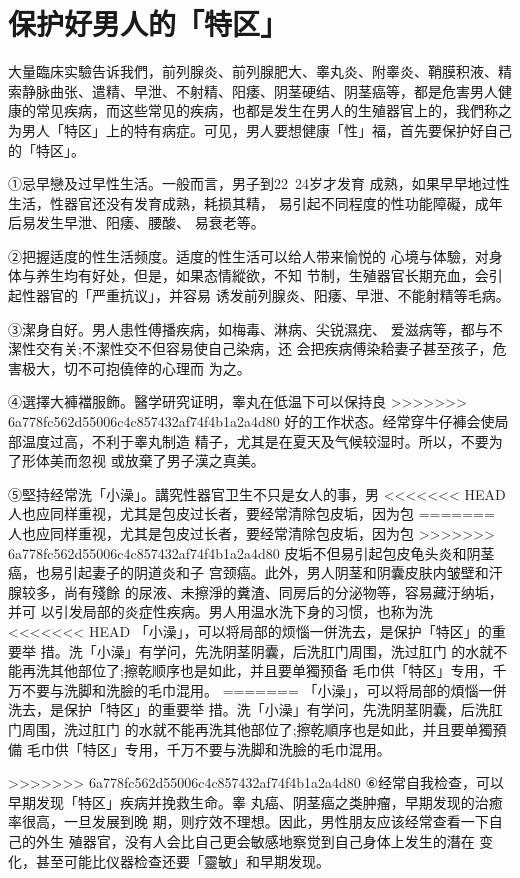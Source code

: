 \documentclass[12pt,UTF8]{ctexbook}
\begin{document}
\section{保护好男人的「特区」}

大量臨床实驗告诉我們，前列腺炎、前列腺肥大、睾丸炎、附睾炎、鞘膜积液、精索静脉曲张、遣精、早泄、不射精、阳痿、阴茎硬结、阴茎癌等，都是危害男人健康的常见疾病，而这些常见的疾病，也都是发生在男人的生殖器官上的，我們称之为男人「特区」上的特有病症。可见，男人要想健康「性」福，首先要保护好自己的「特区」。

①忌早戀及过早性生活。一般而言，男子到22~24岁才发育
成熟，如果早早地过性生活，性器官还没有发育成熟，耗损其精，
易引起不同程度的性功能障礙，成年后易发生早泄、阳痿、腰酸、
易衰老等。

②把握适度的性生活频度。适度的性生活可以给人带来愉悦的
心境与体驗，对身体与养生均有好处，但是，如果态情縱欲，不知
节制，生殖器官长期充血，会引起性器官的「严重抗议」，并容易
诱发前列腺炎、阳痿、早泄、不能射精等毛病。

③潔身自好。男人患性傅播疾病，如梅毒、淋病、尖锐濕疣、
爱滋病等，都与不潔性交有关;不潔性交不但容易使自己染病，还
会把疾病傅染耠妻子甚至孩子，危害极大，切不可抱僥倖的心理而
为之。

④選擇大褲襠服飾。醫学研究证明，睾丸在低温下可以保持良
>>>>>>> 6a778fc562d55006c4c857432af74f4b1a2a4d80
好的工作状态。经常穿牛仔褲会使局部温度过高，不利于睾丸制造
精子，尤其是在夏天及气候较湿时。所以，不要为了形体美而忽视
或放棄了男子漢之真美。

⑤堅持经常洗「小澡」。講究性器官卫生不只是女人的事，男
<<<<<<< HEAD
人也应同样重视，尤其是包皮过长者，要经常清除包皮垢，因为包
=======
人也应同样重视，尤其是包皮过长者，要经常清除包皮垢，因为包
>>>>>>> 6a778fc562d55006c4c857432af74f4b1a2a4d80
皮垢不但易引起包皮龟头炎和阴茎癌，也易引起妻子的阴道炎和子
宫颈癌。此外，男人阴茎和阴囊皮肤内皱壁和汗腺较多，尚有殘餘
的尿液、未擦淨的糞渣、同房后的分泌物等，容易藏汙纳垢，并可
以引发局部的炎症性疾病。男人用温水洗下身的习惯，也称为洗
<<<<<<< HEAD
「小澡」，可以将局部的烦惱一併洗去，是保护「特区」的重要举
措。洗「小澡」有学问，先洗阴茎阴囊，后洗肛门周围，洗过肛门
的水就不能再洗其他部位了;擦乾顺序也是如此，并且要单獨预备
毛巾供「特区」专用，千万不要与洗脚和洗臉的毛巾混用。
=======
「小澡」，可以将局部的煩惱一併洗去，是保护「特区」的重要举
措。洗「小澡」有学问，先洗阴茎阴囊，后洗肛门周围，洗过肛门
的水就不能再洗其他部位了;擦乾順序也是如此，并且要单獨預備
毛巾供「特区」专用，千万不要与洗脚和洗臉的毛巾混用。

>>>>>>> 6a778fc562d55006c4c857432af74f4b1a2a4d80
⑥经常自我检查，可以早期发现「特区」疾病并挽救生命。睾
丸癌、阴茎癌之类肿瘤，早期发现的治癒率很高，一旦发展到晚
期，则疗效不理想。因此，男性朋友应该经常查看一下自己的外生
殖器官，没有人会比自己更会敏感地察觉到自己身体上发生的潛在
变化，甚至可能比仪器检查还要「靈敏」和早期发现。
\end{document}
